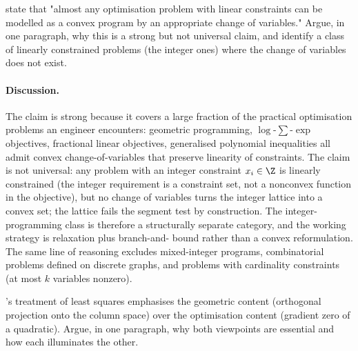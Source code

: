 \begin{exercise}
\textcite{text:boyd-vandenberghe2004} state that "almost any
optimisation problem with linear constraints can be modelled as
a convex program by an appropriate change of variables." Argue,
in one paragraph, why this is a strong but not universal claim,
and identify a class of linearly constrained problems (the
integer ones) where the change of variables does not exist.
\end{exercise}

\paragraph{Discussion.}
The claim is strong because it covers a large fraction of the
practical optimisation problems an engineer encounters:
geometric programming, $\log$-$\sum$-$\exp$ objectives, fractional
linear objectives, generalised polynomial inequalities all admit
convex change-of-variables that preserve linearity of constraints.
The claim is not universal: any problem with an integer constraint
$x_{i} \in \Z$ is linearly constrained (the integer requirement is
a constraint set, not a nonconvex function in the objective), but
no change of variables turns the integer lattice into a convex
set; the lattice fails the segment test by construction. The
integer-programming class is therefore a structurally separate
category, and the working strategy is relaxation plus branch-and-
bound rather than a convex reformulation. The same line of
reasoning excludes mixed-integer programs, combinatorial problems
defined on discrete graphs, and problems with cardinality
constraints (at most $k$ variables nonzero).

\begin{exercise}
\textcite{text:strang2016}'s treatment of least squares
emphasises the geometric content (orthogonal projection onto the
column space) over the optimisation content (gradient zero of a
quadratic). Argue, in one paragraph, why both viewpoints are
essential and how each illuminates the other.
\end{exercise}

